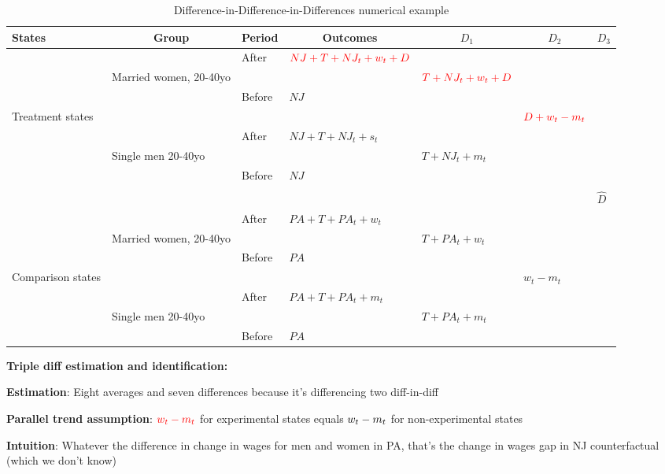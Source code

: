 \documentclass{beamer}
\begin{document}
\begin{frame}[shrink=20]

\begin{table}\centering
		\caption{Difference-in-Difference-in-Differences numerical example}
		\tiny
		\begin{center}
		\begin{tabular}{lll|l|lll}
		\hline \hline
		\multicolumn{1}{l}{\textbf{States}}&
		\multicolumn{1}{c}{\textbf{Group}}&
		\multicolumn{1}{c}{\textbf{Period}}&
		\multicolumn{1}{c}{\textbf{Outcomes}}&
		\multicolumn{1}{c}{$D_1$}&
		\multicolumn{1}{c}{$D_2$}&
		\multicolumn{1}{c}{$D_3$}\\
		\hline
		&&After	&$\textcolor{red}{NJ+T+NJ_t+w_t+D}$					\\
	&Married women, 20-40yo			&&&$\textcolor{red}{T+NJ_t+w_t+D}$			\\
		&&Before	&$NJ$					\\
Treatment states					&&&&&$\textcolor{red}{D+w_t-m_t}$			\\
		&&After	&$NJ+T+NJ_t+s_t$					\\
	&Single men 20-40yo		&&	&$T+NJ_t+m_t$				\\
		&&Before	&$NJ$					\\
								\\
&&&&&&$\widehat{D}$
\\
		&&After	&$PA+T+PA_t+w_t$				\\
	&Married women, 20-40yo			&&&$T+PA_t+w_t$ \\				
		&&Before	&$PA$					\\
Comparison states					&&&&&$w_t-m_t$		\\
		&&After	&$PA+T+PA_t+m_t$					\\
	&Single men 20-40yo		&&&	$T+PA_t+m_t$				\\
		&&Before	&$PA$					\\
		\hline \hline
		\end{tabular}
		\end{center}
	\end{table}
	
\begin{center}
\textbf{Triple diff estimation and identification:} 
\end{center}

\textbf{Estimation}: Eight averages and seven differences because it's differencing two diff-in-diff

\bigskip

\textbf{Parallel trend assumption}: $\textcolor{red}{w_t-m_t}$ for experimental states equals $\textcolor{black}{w_t-m_t}$ for non-experimental states

\bigskip

\textbf{Intuition}: Whatever the difference in change in wages for men and women in PA, that's the change in wages gap in NJ counterfactual (which we don't know)



\end{frame}
\end{document}
